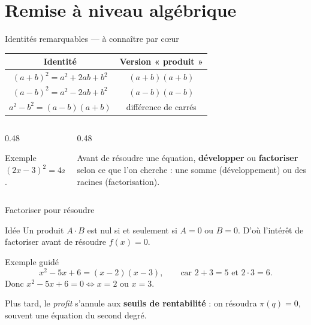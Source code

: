 \documentclass[10pt,aspectratio=169]{beamer}
\numberwithin{dummy}{section}
\newcommand{\Prof}{\pi}
\begin{document}
\section{Remise à niveau algébrique}

\begin{frame}{Identités remarquables --- à connaître par cœur}
\begin{center}
\renewcommand{\arraystretch}{1.55}
\begin{tabular}{c|c}
\toprule
\textbf{Identité} & \textbf{Version « produit »} \\
\midrule
$(a+b)^2=a^2+2ab+b^2$ & $(a+b)(a+b)$ \\
$(a-b)^2=a^2-2ab+b^2$ & $(a-b)(a-b)$ \\
$a^2-b^2=(a-b)(a+b)$ & différence de carrés \\
\bottomrule
\end{tabular}
\end{center}

\vspace{0.6em}
\begin{columns}[T]
\begin{column}{0.48\textwidth}
\begin{exampleblock}{Exemple}
$(2x-3)^2=4x^2-12x+9$.
\end{exampleblock}
\end{column}
\begin{column}{0.48\textwidth}
\begin{boxmethode}[Réflexe]
Avant de résoudre une équation, \textbf{développer} ou \textbf{factoriser} selon ce que l'on cherche : une somme (développement) ou des racines (factorisation).
\end{boxmethode}
\end{column}
\end{columns}
\end{frame}

\begin{frame}{Factoriser pour résoudre}
\begin{block}{Idée}
Un produit $A\cdot B$ est nul si et seulement si $A=0$ ou $B=0$.
D'où l'intérêt de factoriser avant de résoudre $f(x)=0$.
\end{block}

\vspace{0.3em}
\begin{exampleblock}{Exemple guidé}
\[
x^2-5x+6=(x-2)(x-3),
\qquad\text{car } 2+3=5\text{ et }2\cdot 3=6.
\]
Donc $x^2-5x+6=0 \iff x=2$ ou $x=3$.
\end{exampleblock}

\vspace{0.2em}
\begin{boxgestion}
Plus tard, le \emph{profit} s'annule aux \textbf{seuils de rentabilité} :
on résoudra $\Prof(q)=0$, souvent une équation du second degré.
\end{boxgestion}
\end{frame}
\end{document}
